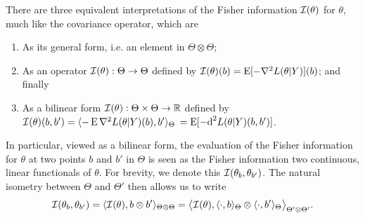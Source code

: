 There are three equivalent interpretations of the Fisher information ${\mathcal I}(\theta)$ for $\theta$, much like the covariance operator, which are 
\begin{enumerate}
  \item As its general form, i.e. an element in $\Theta\otimes\Theta$;
  \item As an operator ${\mathcal I}(\theta):\Theta\to\Theta$ defined by ${\mathcal I}(\theta)(b) = \operatorname{E}[- \nabla^2 L(\theta|Y)](b)$; and finally
  \item As a bilinear form ${\mathcal I}(\theta):\Theta\times\Theta\to\mathbb{R}$ defined by ${\mathcal I}(\theta)(b,b') = \langle-\operatorname{E} \nabla^2 L(\theta|Y)(b), b'\rangle_\Theta$ $= \operatorname{E} [-\text{d}^2 L(\theta|Y)(b,b') ]$.
\end{enumerate}
In particular, viewed as a bilinear form, the evaluation of the Fisher information for $\theta$ at two points $b$ and $b'$ in $\Theta$ is seen as the Fisher information 
two continuous, linear functionals of $\theta$.
For brevity, we denote this ${\mathcal I}(\theta_b,\theta_{b'})$.
The natural isometry between $\Theta$ and $\Theta'$ then allows us to write 
\begin{align}\label{eq:fisher-linear-functional}
  {\mathcal I}(\theta_b,\theta_{b'}) = \langle{\mathcal I}(\theta), b \otimes b'\rangle_{\Theta\otimes\Theta} = \big\langle{\mathcal I}(\theta), \langle\cdot,b\rangle_\Theta \otimes \langle\cdot,b'\rangle_\Theta \big\rangle_{\Theta'\otimes\Theta'}.
\end{align}




